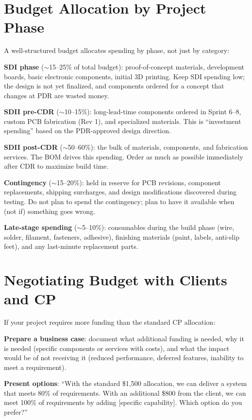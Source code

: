 \section{Budget Allocation by Project Phase}
A well-structured budget allocates spending by phase, not just by category:

\textbf{SDI phase} ($\sim$15--25\% of total budget): proof-of-concept materials, development boards, basic electronic components, initial 3D printing. Keep SDI spending low; the design is not yet finalized, and components ordered for a concept that changes at PDR are wasted money.

\textbf{SDII pre-CDR} ($\sim$10--15\%): long-lead-time components ordered in Sprint 6--8, custom PCB fabrication (Rev 1), and specialized materials. This is ``investment spending'' based on the PDR-approved design direction.

\textbf{SDII post-CDR} ($\sim$50--60\%): the bulk of materials, components, and fabrication services. The BOM drives this spending. Order as much as possible immediately after CDR to maximize build time.

\textbf{Contingency} ($\sim$15--20\%): held in reserve for PCB revisions, component replacements, shipping surcharges, and design modifications discovered during testing. Do not plan to spend the contingency; plan to have it available when (not if) something goes wrong.

\textbf{Late-stage spending} ($\sim$5--10\%): consumables during the build phase (wire, solder, filament, fasteners, adhesive), finishing materials (paint, labels, anti-slip feet), and any last-minute replacement parts.

\section{Negotiating Budget with Clients and CP}
If your project requires more funding than the standard CP allocation:

\textbf{Prepare a business case}: document what additional funding is needed, why it is needed (specific components or services with costs), and what the impact would be of not receiving it (reduced performance, deferred features, inability to meet a requirement).

\textbf{Present options}: ``With the standard \$1,500 allocation, we can deliver a system that meets 80\% of requirements. With an additional \$800 from the client, we can meet 100\% of requirements by adding [specific capability]. Which option do you prefer?''

